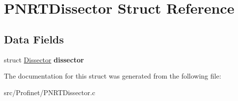 \hypertarget{struct_p_n_r_t_dissector}{\section{P\-N\-R\-T\-Dissector Struct Reference}
\label{struct_p_n_r_t_dissector}
}
\subsection*{Data Fields}
\begin{DoxyCompactItemize}
\item 
\hypertarget{struct_p_n_r_t_dissector_a2ec7a75e801e4a714f32310cdf37546f}{struct \hyperlink{struct_dissector}{Dissector} {\bfseries dissector}}\label{struct_p_n_r_t_dissector_a2ec7a75e801e4a714f32310cdf37546f}

\end{DoxyCompactItemize}


The documentation for this struct was generated from the following file\-:\begin{DoxyCompactItemize}
\item 
src/\-Profinet/P\-N\-R\-T\-Dissector.\-c\end{DoxyCompactItemize}
